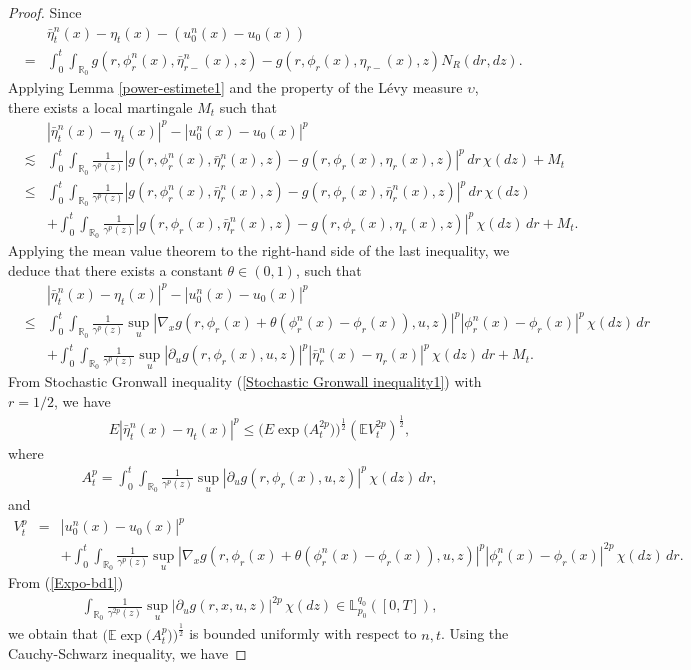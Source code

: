 \documentclass[12pt,oneside, reqno]{amsart}
\newcommand{\be}{\begin{eqnarray}}
\newcommand{\ee}{\end{eqnarray}}
\newcommand{\ce}{\begin{eqnarray*}}
\newcommand{\de}{\end{eqnarray*}}
\def\mE{{\mathbb E}}
\def\mL{{\mathbb L}}
\def\mR{{\mathbb R}}
\def\leq{\leqslant}
\numberwithin{equation}{section}
\begin{document}
	\begin{proof}
		
		
		Since 
		\ce 
		&&\bar\eta_t^n(x)-\eta_t(x)-(u_0^n(x)-u_0(x))\\
		&=&\int_0^t\int_{\mR_0} g(r,\phi_{r}^n(x),\bar\eta_{r-}^n(x),z)-g(r,\phi_{r}(x),\eta_{r-}(x),z)N_R(dr,dz).
		\de 
  Applying Lemma \ref{power-estimete1} and the property of the L\'{e}vy measure $\upsilon$, there exists a local martingale $M_t$ such that 
			\ce 
		&&|\bar\eta_t^n(x)-\eta_t(x)|^p-|u_0^n(x)-u_0(x)|^p\\
		&\lesssim &\int_0^t\int_{\mR_0} \frac{1}{\gamma^p(z)}|g(r,\phi_{r}^n(x),\bar\eta_{r}^n(x),z)-g(r,\phi_{r}(x),\eta_{r}(x),z)|^p\,dr\,\chi(dz)+M_t\\
		&\leq &\int_0^t\int_{\mR_0}\frac{1}{\gamma^p(z)} |g(r,\phi_{r}^n(x),\bar\eta_{r}^n(x),z)-g(r,\phi_{r}(x),\bar\eta_{r}^n(x),z)|^p\,dr\,\chi(dz)\\
		&&+\int_0^t\int_{\mR_0} \frac{1}{\gamma^p(z)} |g(r,\phi_{r}(x),\bar\eta_{r}^n(x),z)-g(r,\phi_{r}(x),\eta_{r}(x),z)|^p\,\chi(dz)\,dr+M_t.
		\de 
	Applying the mean value theorem  to the right-hand side of the last inequality, we deduce that there exists a constant $\theta\in(0,1)$, such that
		\ce 
			&&|\bar\eta_t^n(x)-\eta_t(x)|^p-|u_0^n(x)-u_0(x)|^p\\
		&\leq &\int_0^t\int_{\mR_0}\frac{1}{\gamma^p(z)} \sup_u|\nabla_x g(r,\phi_{r}(x)+\theta (\phi_{r}^n(x)-\phi_{r}(x)),u,z)|^p|\phi_{r}^n(x)-\phi_{r}(x)|^p\,\chi(dz)\,dr\\
		&&+\int_0^t\int_{\mR_0}\frac{1}{\gamma^{p}(z)} \sup_u|\partial_u g(r,\phi_{r}(x),u,z)|^p|\bar\eta_{r}^n(x)-\eta_{r}(x)|^p\,\chi(dz)\,dr+M_t.
		\de 
 From	Stochastic Gronwall inequality (\ref{Stochastic Gronwall inequality1}) with $r=1/2$, we have 
\be\label{result- Gronwall22} 
E |\bar\eta_t^n(x)-\eta_t(x)|^p \leq \bigg(E \exp\big(A_t^{2p}\big)\bigg)^{\frac{1}{2}}(\mE V_{t}^{2p})^{\frac{1}{2}},
\ee 
where 
\ce 
A_t^p=\int_0^t\int_{\mR_0}\frac{1}{\gamma^{p}(z)}\sup_u|\partial_u g(r,\phi_{r}(x),u,z)|^{p}\,\chi(dz)\,dr,
\de 
and 
\ce 
V_t^p&=&|u_0^n(x)-u_0(x)|^{p}\\
&&+\int_0^t\int_{\mR_0}\frac{1}{\gamma^{p}(z)} \sup_u|\nabla_x g(r,\phi_{r}(x)+\theta (\phi_{r}^n(x)-\phi_{r}(x)),u,z)|^{p}|\phi_{r}^n(x)-\phi_{r}(x)|^{2p}\,\chi(dz)\,dr.
\de 	
From (\ref{Expo-bd1})
\ce 
\int_{\mR_0}\frac{1}{\gamma^{2p}(z)} \sup_u|\partial_u g(r,x,u,z)|^{2p}\,\chi(dz)\in \mL_{p_0}^{q_0}([0,T]), 
 \de
 we obtain that $\bigg(\mE \exp\big(A_t^p\big)\bigg)^{\frac{1}{2}}$ is bounded uniformly with respect to $n,t$. 
Using the Cauchy-Schwarz inequality, we have 

\end{proof}
\end{document}
